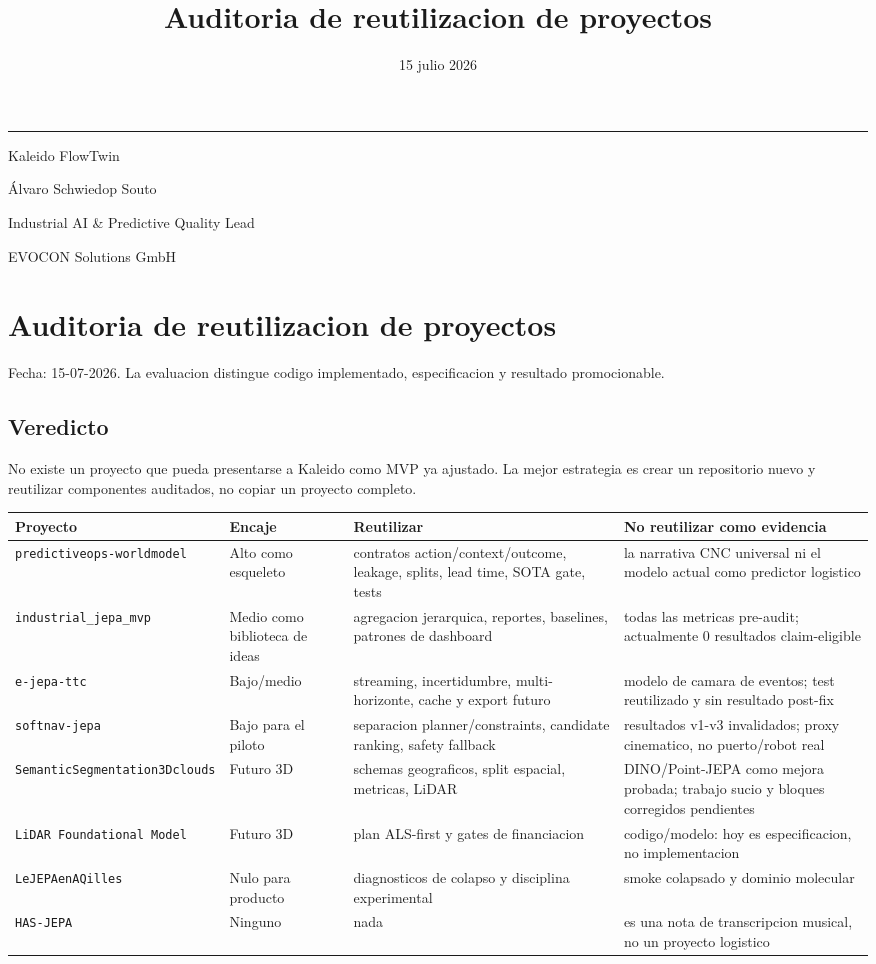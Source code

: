 \documentclass[
  spanish,
  10pt,
  a4paper,
]{article}
\title{Auditoria de reutilizacion de proyectos}
\author{}
\date{15 julio 2026}
\makeatletter
\newcounter{none} %
\renewcommand{\maketitle}{%
  \hypersetup{pageanchor=false}
  \begin{titlepage}
    \pagecolor{KaleidoNavy}
    \color{white}
    \vspace*{1.4cm}
    {\color{KaleidoCyan}\rule{2.4cm}{2.5pt}\par}
    \vspace{1.1cm}
    {\Huge\bfseries\@title\par}
    \vspace{0.65cm}
    {\Large\color{KaleidoMint}Kaleido FlowTwin\par}
    \vfill
    {\large Álvaro Schwiedop Souto\par}
    \vspace{0.15cm}
    {\normalsize\color{KaleidoMint}Industrial AI \& Predictive Quality Lead\par}
    \vspace{0.15cm}
    {\normalsize\color{KaleidoMint}EVOCON Solutions GmbH\par}
    \vspace{0.25cm}
    {\normalsize\color{KaleidoMint}\@date\par}
  \end{titlepage}
  \hypersetup{pageanchor=true}
  \nopagecolor
  \color{black}
}
\makeatother
\begin{document}
\maketitle

{
\setcounter{tocdepth}{3}
\tableofcontents
}
\section{Auditoria de reutilizacion de
proyectos}\label{auditoria-de-reutilizacion-de-proyectos}

Fecha: 15-07-2026. La evaluacion distingue codigo implementado,
especificacion y resultado promocionable.

\subsection{Veredicto}\label{veredicto}

No existe un proyecto que pueda presentarse a Kaleido como MVP ya
ajustado. La mejor estrategia es crear un repositorio nuevo y reutilizar
componentes auditados, no copiar un proyecto completo.

{\def\LTcaptype{none} %
\begin{longtable}[]{@{}llll@{}}
\toprule\noalign{}
Proyecto & Encaje & Reutilizar & No reutilizar como evidencia \\
\midrule\noalign{}
\endhead
\bottomrule\noalign{}
\endlastfoot
\texttt{predictiveops-worldmodel} & Alto como esqueleto & contratos
action/context/outcome, leakage, splits, lead time, SOTA gate, tests &
la narrativa CNC universal ni el modelo actual como predictor
logistico \\
\texttt{industrial\_jepa\_mvp} & Medio como biblioteca de ideas &
agregacion jerarquica, reportes, baselines, patrones de dashboard &
todas las metricas pre-audit; actualmente 0 resultados claim-eligible \\
\texttt{e-jepa-ttc} & Bajo/medio & streaming, incertidumbre,
multi-horizonte, cache y export futuro & modelo de camara de eventos;
test reutilizado y sin resultado post-fix \\
\texttt{softnav-jepa} & Bajo para el piloto & separacion
planner/constraints, candidate ranking, safety fallback & resultados
v1-v3 invalidados; proxy cinematico, no puerto/robot real \\
\texttt{SemanticSegmentation3Dclouds} & Futuro 3D & schemas geograficos,
split espacial, metricas, LiDAR & DINO/Point-JEPA como mejora probada;
trabajo sucio y bloques corregidos pendientes \\
\texttt{LiDAR\ Foundational\ Model} & Futuro 3D & plan ALS-first y gates
de financiacion & codigo/modelo: hoy es especificacion, no
implementacion \\
\texttt{LeJEPAenAQilles} & Nulo para producto & diagnosticos de colapso
y disciplina experimental & smoke colapsado y dominio molecular \\
\texttt{HAS-JEPA} & Ninguno & nada & es una nota de transcripcion
musical, no un proyecto logistico \\
\end{longtable}
}
\end{document}

